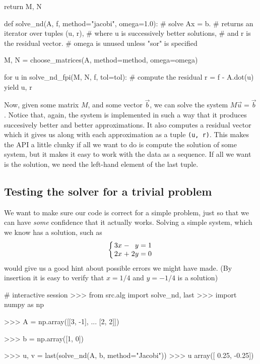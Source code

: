 \documentclass[12pt]{article}
\begin{document}
\begin{multicols}{2}
\begin{python}[
        caption={Argument-``parser'' and choice of $M$, $N$.}
    ]
    return M, N


def solve_nd(A, f, method="jacobi", omega=1.0):
    # solve Ax = b.
    # returns an iterator over tuples (u, r),
    # where u is successively better solutions,
    # and r is the residual vector.
    # omega is unused unless "sor" is specified

    M, N = choose_matrices(A, method=method, omega=omega)

    for u in solve_nd_fpi(M, N, f, tol=tol):
        # compute the residual
        r = f - A.dot(u)
        yield u, r
    \end{python}
    Now, given some matrix $M$, and some vector $\vec b$,
    we can solve the system $M\vec u = \vec b$.
    Notice that, again, the system is implemented in such a way that it
    produces succesively better and better approximations.
    It also computes a residual vector which it gives us along with
    each approximation as a tuple {\tt (u, r)}.
    This makes the API a little clunky if all we want to do is
    compute the solution of some system, but it makes it easy to
    work with the data as a sequence.
    If all we want is the solution, we need the left-hand element of
    the last tuple.

    \subsection*{Testing the solver for a trivial problem}
    We want to make sure our code is correct for a simple problem,
    just so that we can have {\em some} confidence that it actually
    works.
    Solving a simple system, which we know has a solution,
    such as
    \[
        \arraycolsep=1.4pt\def\arraystretch{1}
        \left\{\begin{array}{rcrcr}
            3x &-&  y &=&  1 \\
            2x &+& 2y &=&  0 \\
        \end{array}\right.
    \]
    would give us a good hint about possible errors we might have made.
    (By insertion it is easy to verify that $x = 1/4$ and $y = -1/4$ is a solution)
    \begin{python}
# interactive session
>>> from src.alg import solve_nd, last
>>> import numpy as np

>>> A = np.array([[3, -1],
...               [2,  2]])

>>> b = np.array([1, 0])

>>> u, v = last(solve_nd(A, b, method="Jacobi"))
>>> u
array([ 0.25, -0.25])


\end{python}
\end{multicols}
\end{document}
